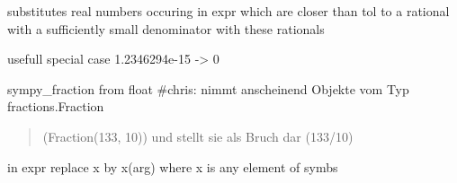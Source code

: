 \documentclass[letterpaper,10pt,english]{sphinxmanual}
\begin{document}

\begin{fulllineitems}
\label{pycontroltools:auxfuncs.math.miscmath.rationalize_expression}
substitutes real numbers occuring in expr which are closer than tol to a
rational with a sufficiently small denominator with these rationals

usefull special case 1.2346294e-15 -\textgreater{} 0

\end{fulllineitems}


\begin{fulllineitems}
\label{pycontroltools:auxfuncs.math.miscmath.real_roots}
\end{fulllineitems}


\begin{fulllineitems}
\label{pycontroltools:auxfuncs.math.miscmath.roots}
\end{fulllineitems}


\begin{fulllineitems}
\label{pycontroltools:auxfuncs.math.miscmath.sp_fff}
sympy\_fraction from float
\#chris: nimmt anscheinend Objekte vom Typ fractions.Fraction
\begin{quote}

(Fraction(133, 10)) und stellt sie als Bruch dar (133/10)
\end{quote}

\end{fulllineitems}


\begin{fulllineitems}
\label{pycontroltools:auxfuncs.math.miscmath.symbs_to_func}
in expr replace x by x(arg)
where x is any element of symbs

\end{fulllineitems}
\end{document}
